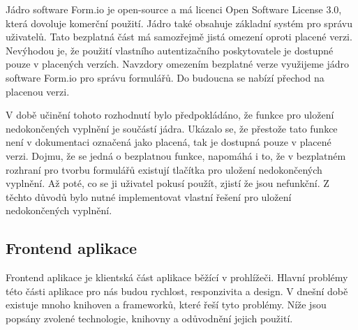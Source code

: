 Jádro software Form.io je open-source a má licenci Open Software License 3.0, která dovoluje komerční použití.
Jádro také obsahuje základní systém pro správu uživatelů.
Tato bezplatná část má samozřejmě jistá omezení oproti placené verzi.
Nevýhodou je, že použití vlastního autentizačního poskytovatele je dostupné pouze v placených verzích.
Navzdory omezením bezplatné verze využijeme jádro software Form.io pro správu formulářů.
Do budoucna se nabízí přechod na placenou verzi.

V době učinění tohoto rozhodnutí bylo předpokládáno, že funkce pro uložení nedokončených vyplnění je součástí jádra.
Ukázalo se, že přestože tato funkce není v dokumentaci označená jako placená, tak je dostupná pouze v placené verzi.
Dojmu, že se jedná o bezplatnou funkce, napomáhá i to, že v bezplatném rozhraní pro tvorbu formulářů existují tlačítka pro uložení nedokončených vyplnění.
Až poté, co se ji uživatel pokusí použít, zjistí že jsou nefunkční.
Z těchto důvodů bylo nutné implementovat vlastní řešení pro uložení nedokončených vyplnění.

\subsection{Frontend aplikace}\label{subsec:frontend-aplikace}

Frontend aplikace je klientská část aplikace běžící v prohlížeči.
Hlavní problémy této části aplikace pro nás budou rychlost, responzivita a design.
V dnešní době existuje mnoho knihoven a frameworků, které řeší tyto problémy.
Níže jsou popsány zvolené technologie, knihovny a odůvodnění jejich použití.

